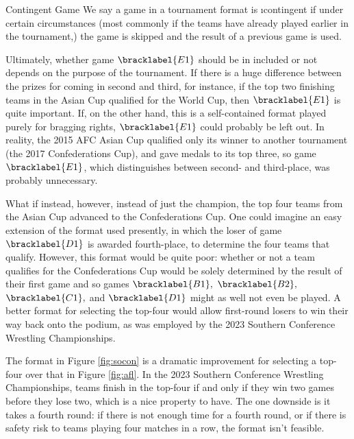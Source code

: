 {    \begin{definition}{Contingent Game}{}
        We say a game in a tournament format is \i{contingent} if under certain circumstances (most commonly if the teams have already played earlier in the tournament,) the game is skipped and the result of a previous game is used.
    \end{definition}

    Ultimately, whether game $\bracklabel{E1}$ should be in included or not depends on the purpose of the tournament. If there is a huge difference between the prizes for coming in second and third, for instance, if the top two finishing teams in the Asian Cup qualified for the World Cup, then $\bracklabel{E1}$ is quite important. If, on the other hand, this is a self-contained format played purely for bragging rights, $\bracklabel{E1}$ could probably be left out. In reality, the 2015 AFC Asian Cup qualified only its winner to another tournament (the 2017 Confederations Cup), and gave medals to its top three, so game $\bracklabel{E1}$, which distinguishes between second- and third-place, was probably unnecessary.

    What if instead, however, instead of just the champion, the top four teams from the Asian Cup advanced to the Confederations Cup. One could imagine an easy extension of the format used presently, in which the loser of game $\bracklabel{D1}$ is awarded fourth-place, to determine the four teams that qualify. However, this format would be quite poor: whether or not a team qualifies for the Confederations Cup would be solely determined by the result of their first game and so games $\bracklabel{B1},$ $\bracklabel{B2},$ $\bracklabel{C1},$ and $\bracklabel{D1}$ might as well not even be played. A better format for selecting the top-four would allow first-round losers to win their way back onto the podium, as was employed by the 2023 Southern Conference Wrestling Championships.


    The format in Figure \ref{fig:socon} is a dramatic improvement for selecting a top-four over that in Figure \ref{fig:afl}. In the 2023 Southern Conference Wrestling Championships, teams finish in the top-four if and only if they win two games before they lose two, which is a nice property to have. The one downside is it takes a fourth round: if there is not enough time for a fourth round, or if there is safety risk to teams playing four matches in a row, the format isn't feasible.

}
